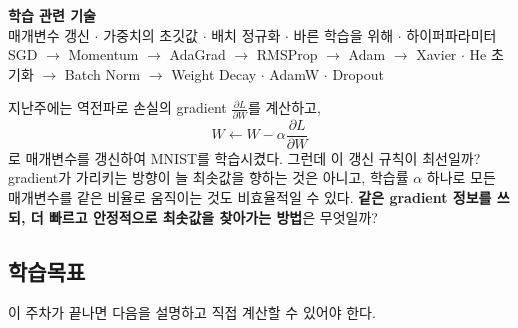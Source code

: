 \documentclass[11pt,a4paper]{article}
\newcommand{\pd}[2]{\frac{\partial #1}{\partial #2}}
\begin{document}

\begin{center}
{\LARGE\bfseries 학습 관련 기술}\\[0.35em]
{\large 매개변수 갱신 $\cdot$ 가중치의 초깃값 $\cdot$ 배치 정규화 $\cdot$ 바른 학습을 위해 $\cdot$ 하이퍼파라미터}\\[0.35em]
{\normalsize SGD $\rightarrow$ Momentum $\rightarrow$ AdaGrad $\rightarrow$ RMSProp $\rightarrow$ Adam $\rightarrow$ Xavier $\cdot$ He 초기화 $\rightarrow$ Batch Norm $\rightarrow$ Weight Decay $\cdot$ AdamW $\cdot$ Dropout}\\[0.8em]
\end{center}

\vspace{0.4em}

\begin{keybox}[이번 주의 핵심 질문]
지난주에는 역전파로 손실의 gradient $\pd{L}{W}$를 계산하고,
\[
W\leftarrow W-\alpha\pd{L}{W}
\]
로 매개변수를 갱신하여 MNIST를 학습시켰다.
그런데 이 갱신 규칙이 최선일까?
gradient가 가리키는 방향이 늘 최솟값을 향하는 것은 아니고,
학습률 $\alpha$ 하나로 모든 매개변수를 같은 비율로 움직이는 것도 비효율적일 수 있다.
\textbf{같은 gradient 정보를 쓰되, 더 빠르고 안정적으로 최솟값을 찾아가는 방법}은 무엇일까?
\end{keybox}

\subsection*{학습목표}

이 주차가 끝나면 다음을 설명하고 직접 계산할 수 있어야 한다.
\end{document}
